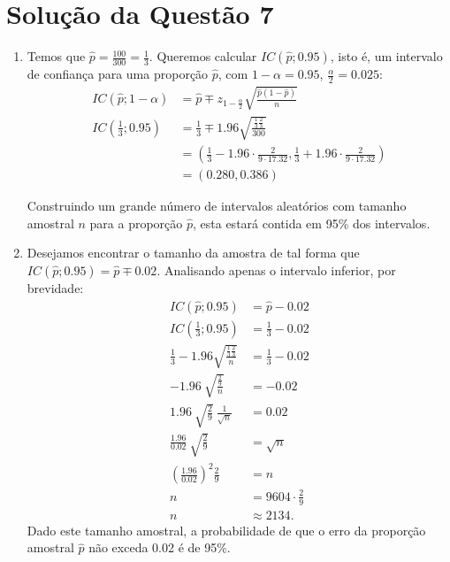 \documentclass[
	12pt,				%
	openright,			%
	oneside,			%
	a4paper,			%
	english,			%
	brazil,				%
	]{abntex2}
\begin{document}
\section{Solução da Questão 7}
\begin{enumerate}[label=\alph*)]
    \item Temos que $\hat{p} = \frac{100}{300} = \frac{1}{3}$. Queremos calcular $IC(\hat{p};0.95)$, isto é, um intervalo de confiança para uma proporção $\hat{p}$, com $1 - \alpha = 0.95$, $\frac{\alpha}{2} = 0.025$:
    \begin{align*}
        IC(\hat{p};1 - \alpha) &= \hat{p} \mp z_{1 - \frac{\alpha}{2}} \sqrt{\frac{\hat{p}(1 - \hat{p})}{n}}\\
        IC\left(\frac{1}{3};0.95\right) &= \frac{1}{3} \mp 1.96 \sqrt{\frac{\frac{1}{3}\frac{2}{3}}{300}}\\
        &= \left(\frac{1}{3} - 1.96 \cdot \frac{2}{9 \cdot 17.32}, \frac{1}{3} + 1.96 \cdot \frac{2}{9 \cdot 17.32}\right)\\
        &= (0.280, 0.386)
    \end{align*}
    
    Construindo um grande número de intervalos aleatórios com tamanho amostral $n$ para a proporção $\hat{p}$, esta estará contida em 95\% dos intervalos.
    
    \item Desejamos encontrar o tamanho da amostra de tal forma que $IC(\hat{p};0.95) = \hat{p} \mp 0.02$. Analisando apenas o intervalo inferior, por brevidade:
    \begin{align*}
        IC(\hat{p};0.95) &= \hat{p} - 0.02\\
        IC\left(\frac{1}{3};0.95\right) &= \frac{1}{3} - 0.02\\
        \frac{1}{3} - 1.96 \sqrt{\frac{\frac{1}{3}\frac{2}{3}}{n}} &= \frac{1}{3} - 0.02\\
        - 1.96\ \sqrt{\frac{\frac{2}{9}}{n}} &= - 0.02\\
        1.96\ \sqrt{\frac{2}{9}}\ \frac{1}{\sqrt{n}} &= 0.02\\
        \frac{1.96}{0.02}\ \sqrt{\frac{2}{9}} &= \sqrt{n}\\
        \left(\frac{1.96}{0.02}\right)^2 \frac{2}{9} &= n\\
        n &= 9604 \cdot \frac{2}{9}\\
        n &\approx 2134.
    \end{align*}
    Dado este tamanho amostral, a probabilidade de que o erro da proporção amostral $\hat{p}$ não exceda 0.02 é de 95\%.
\end{enumerate}
\end{document}
